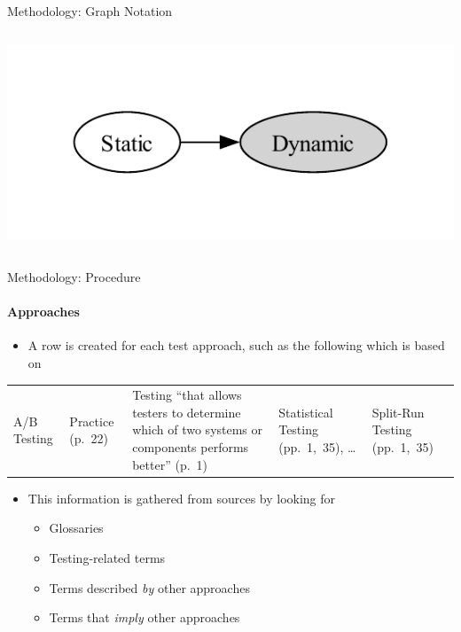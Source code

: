 \documentclass{beamer}
\begin{document}
\begin{frame}[t]{Methodology: Graph Notation}
\begin{columns}[T]
\begin{column}{.6\textwidth}
\begin{itemize}
                      \vspace{-0.5cm}
                      \includegraphics[width=\linewidth]{assets/graphs/manual/catRels9.pdf}
            \end{itemize}
        \end{column}
    \end{columns}
\end{frame}

\begin{frame}{Methodology: Procedure}
    \framesubtitle{Approaches}
    \begin{itemize}
        \item A row is created for each test approach, such as the following which is based on \citep{IEEE2022}
    \end{itemize}
    \begin{center}
        \small
        \begin{tabularx}{\linewidth}{|M{1.1cm}|M{1.4cm}|X|M{1.7cm}|M{1.8cm}|}
            \hline
             &  &                                                                             &                &    \\
            \hline
            A/B Testing           & Practice (p.~22)          & Testing ``that allows testers to determine which of two systems or components performs better'' (p.~1) & Statistical Testing (pp.~1,~35), \dots{} & Split-Run Testing (pp.~1,~35) \\
            \hline
        \end{tabularx}
    \end{center}
    \pause
    \begin{itemize}
        \item This information is gathered from sources by looking for
              \begin{itemize}
                  \item Glossaries
                  \item Testing-related terms
                  \item Terms described \emph{by} other approaches
                  \item Terms that \emph{imply} other approaches
              \end{itemize}
    \end{itemize}
\end{frame}
\end{document}
